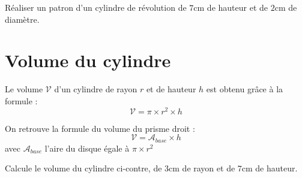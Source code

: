 \documentclass[a4paper,10pt]{report}
\begin{document}
\newpage
\begin{ex}
Réaliser un patron d'un cylindre de révolution de $7$cm de hauteur et de $2$cm de diamètre.

\medskip
\noindent\petitscarreaux{16.5cm}{7.5cm}
\end{ex}

\section{Volume du cylindre}

\begin{prop}
Le volume $\mathcal{V}$ d'un cylindre de rayon $r$ et de hauteur $h$ est obtenu grâce à la formule :
$$ \mathcal{V} = \pi \times r^2 \times h $$
\end{prop}

\begin{rem}
On retrouve la formule du volume du prisme droit : $$\mathcal{V} = \mathcal{A}_{base} \times h$$
avec $\mathcal{A}_{base}$ l'aire du disque égale à $\pi \times r^2$
\end{rem}

\begin{ex}
Calcule le volume du cylindre ci-contre, de $3$cm de rayon et de $7$cm de hauteur.

\medskip
\noindent\grandscarreaux{\linewidth}{7.2cm}
\end{ex}
\end{document}
